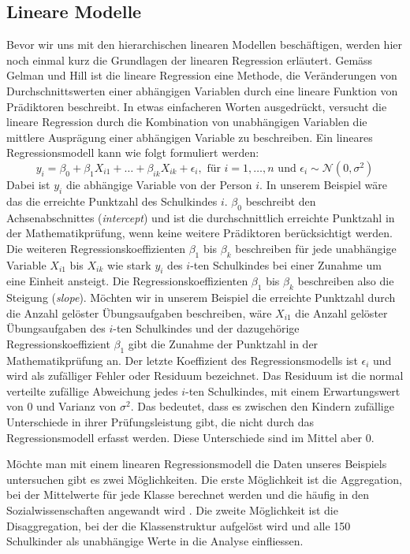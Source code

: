 \documentclass[12pt]{article}\usepackage[]{graphicx}\usepackage[]{color}
\numberwithin{equation}{section}
\begin{document}
\subsection{Lineare Modelle}
Bevor wir uns mit den hierarchischen linearen Modellen beschäftigen, werden hier noch einmal kurz die Grundlagen der linearen Regression erläutert. Gemäss Gelman und Hill \citeyearpar{andrew_data} ist die lineare Regression eine Methode, die Veränderungen von Durchschnittswerten einer abhängigen Variablen durch eine lineare Funktion von Prädiktoren beschreibt. In etwas einfacheren Worten ausgedrückt, versucht die lineare Regression durch die Kombination von unabhängigen Variablen die mittlere Ausprägung einer abhängigen Variable zu beschreiben. Ein lineares Regressionsmodell kann wie folgt formuliert werden:
\begin{equation}
y_{i} = \beta_{0} + \beta_{1}X_{i1} + \dots + \beta_{ik}X_{ik} + \epsilon_{i}, \text{ für } i = 1, \dots, n \text{ und } \epsilon_{i} \sim \mathcal{N}(0,\sigma^{2})
\end{equation}
Dabei ist $y_{i}$ die abhängige Variable von der Person $i$. In unserem Beispiel wäre das die erreichte Punktzahl des Schulkindes $i$. $\beta_0$ beschreibt den Achsenabschnittes (\textit{intercept}) und ist die durchschnittlich erreichte Punktzahl in der Mathematikprüfung, wenn keine weitere Prädiktoren berücksichtigt werden. Die weiteren Regressionskoeffizienten $\beta_{1}$ bis $\beta_{k}$ beschreiben für jede unabhängige Variable $X_{i1}$ bis $X_{ik}$ wie stark $y_{i}$ des $i$-ten Schulkindes bei einer Zunahme um eine Einheit ansteigt. Die Regressionskoeffizienten $\beta_{1}$ bis $\beta_{k}$ beschreiben also die Steigung (\textit{slope}). Möchten wir in unserem Beispiel die erreichte Punktzahl durch die Anzahl gelöster Übungsaufgaben beschreiben, wäre $X_{i1}$ die Anzahl gelöster Übungsaufgaben des $i$-ten Schulkindes und der dazugehörige Regressionskoeffizient $\beta_{1}$ gibt die Zunahme der Punktzahl in der Mathematikprüfung an. Der letzte Koeffizient des Regressionsmodells ist $\epsilon_{i}$ und wird als zufälliger Fehler oder Residuum bezeichnet. Das Residuum ist die normal verteilte zufällige Abweichung jedes $i$-ten Schulkindes, mit einem Erwartungswert von 0 und Varianz von $\sigma^{2}$. Das bedeutet, dass es zwischen den Kindern zufällige Unterschiede in ihrer Prüfungsleistung gibt, die nicht durch das Regressionsmodell erfasst werden. Diese Unterschiede sind im Mittel aber 0. 

Möchte man mit einem linearen Regressionsmodell die Daten unseres Beispiels untersuchen gibt es zwei Möglichkeiten. Die erste Möglichkeit ist die Aggregation, bei der Mittelwerte für jede Klasse berechnet werden und die häufig in den Sozialwissenschaften angewandt wird \citep{SnijdersTomA.B2012Ma:a}. Die zweite Möglichkeit ist die Disaggregation, bei der die Klassenstruktur aufgelöst wird und alle 150 Schulkinder als unabhängige Werte in die Analyse einfliessen.
\end{document}
